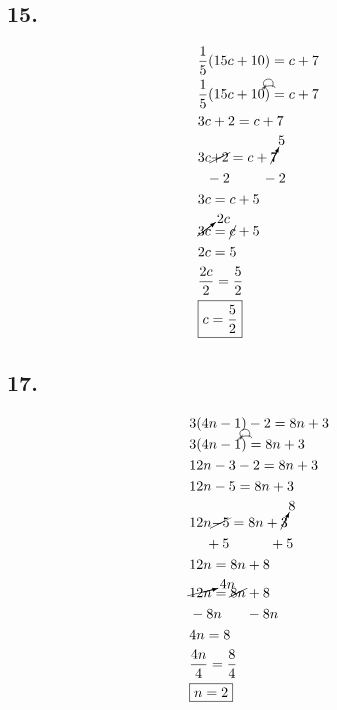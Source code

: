 \documentclass{article}
\newcommand{\tikzmark}[1]{\tikz[overlay,remember picture] \node (#1) {};}
\newcommand{\DrawBox}[2]{%
    \begin{tikzpicture}[overlay,remember picture]
        \draw[->,shorten >=5pt,shorten <=5pt,out=70,in=130,distance=0.5cm,#1] (MarkA.north) to (MarkC.north);
        \draw[->,shorten >=5pt,shorten <=5pt,out=50,in=140,distance=0.3cm,#2] (MarkA.north) to (MarkB.north);
    \end{tikzpicture}
}
\begin{document}
    \subsection*{15.}
    \begin{align*}
        & \frac{1}{5}(15c + 10) = c + 7 \\
        & \tikzmark{MarkA}\frac{1}{5} (15c\tikzmark{MarkB} + 10\tikzmark{MarkC})\DrawBox{black}{black} = c + 7 \\
        & 3c + 2 = c + 7 \\
        & 3c \cancel{+ 2} = c + \cancelto{5}{7} \\
        & \hspace{.2cm}- 2\hspace{.8cm}- 2 \\
        & 3c = c + 5 \\
        & \cancelto{2c}{3c} = \cancel{c} + 5 \\
        & 2c = 5 \\
        & \frac{2c}{2} = \frac{5}{2} \\
        & \boxed{c = \frac{5}{2}}
    \end{align*}

    \subsection*{17.}
    \begin{align*}
        & 3(4n -1) - 2 = 8n + 3 \\
        & \tikzmark{MarkA}3 (4n\tikzmark{MarkB} - 1\tikzmark{MarkC})\DrawBox{black}{black} = 8n + 3 \\
        & 12n - 3 - 2 = 8n + 3 \\
        & 12n - 5 = 8n + 3 \\
        & 12n \cancel{- 5} = 8n + \cancelto{8}{3} \\
        & \hspace{.4cm}+ 5 \hspace{1cm}+ 5 \\
        & 12n = 8n + 8 \\
        & \cancelto{4n}{12n} = \cancel{8n} + 8 \\
        & - 8n \hspace{.6cm} -8n \\
        & 4n = 8 \\
        & \frac{4n}{4} = \frac{8}{4} \\
        & \boxed{n = 2}
    \end{align*}
\end{document}
